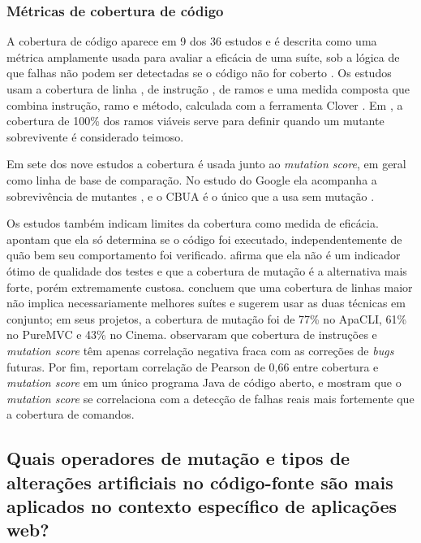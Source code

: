 \subsubsection{Métricas de cobertura de código}

A cobertura de código aparece em 9 dos 36 estudos e é descrita como uma métrica amplamente usada para avaliar a eficácia de uma suíte, sob a lógica de que falhas não podem ser detectadas se o código não for coberto \cite{zhang2022}. Os estudos usam a cobertura de linha \cite{nica2011, alenezi2016, petrovic2021}, de instrução \cite{just2014, ahmed2016}, de ramos \cite{yao2014} e uma medida composta que combina instrução, ramo e método, calculada com a ferramenta Clover \cite{assylbekov2013}. Em , a cobertura de 100\% dos ramos viáveis serve para definir quando um mutante sobrevivente é considerado teimoso.

Em sete dos nove estudos a cobertura é usada junto ao \textit{mutation score}, em geral como linha de base de comparação. No estudo do Google ela acompanha a sobrevivência de mutantes \cite{petrovic2021}, e o CBUA é o único que a usa sem mutação \cite{zhang2022}.

Os estudos também indicam limites da cobertura como medida de eficácia.  apontam que ela só determina se o código foi executado, independentemente de quão bem seu comportamento foi verificado.  afirma que ela não é um indicador ótimo de qualidade dos testes e que a cobertura de mutação é a alternativa mais forte, porém extremamente custosa.  concluem que uma cobertura de linhas maior não implica necessariamente melhores suítes e sugerem usar as duas técnicas em conjunto; em seus projetos, a cobertura de mutação foi de 77\% no ApaCLI, 61\% no PureMVC e 43\% no Cinema.  observaram que cobertura de instruções e \textit{mutation score} têm apenas correlação negativa fraca com as correções de \textit{bugs} futuras. Por fim,  reportam correlação de Pearson de 0,66 entre cobertura e \textit{mutation score} em um único programa Java de código aberto, e  mostram que o \textit{mutation score} se correlaciona com a detecção de falhas reais mais fortemente que a cobertura de comandos.

\subsection[Quais operadores são mais utilizadas na literatura?]{Quais operadores de mutação e tipos de alterações artificiais no código-fonte são mais aplicados no contexto específico de aplicações web?}
\label{subsec:operadores-utilizadas}

